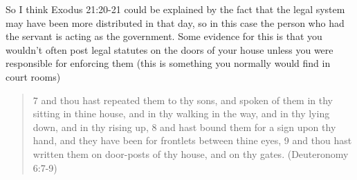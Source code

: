 \documentclass[11pt]{article}
\begin{document}
{So I think Exodus 21:20-21 could be explained by the fact that the legal system may have been more distributed in that day, so in this case the person who had the servant is acting as the government. Some evidence for this is that you wouldn't often post legal statutes on the doors of your house unless you were responsible for enforcing them (this is something you normally would find in court rooms)


\begin{quote}
7 and thou hast repeated them to thy sons, and spoken of them in thy sitting in thine house, and in thy walking in the way, and in thy lying down, and in thy rising up,
8 and hast bound them for a sign upon thy hand, and they have been for frontlets between thine eyes,
9 and thou hast written them on door-posts of thy house, and on thy gates. (Deuteronomy 6:7-9)
\end{quote} 

}
\end{document}
